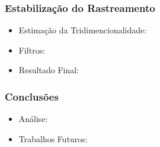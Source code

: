 \documentclass[brazil]{beamer}
\begin{document}
\begin{frame}
\frametitle{Estabilização do Rastreamento}
  \begin{itemize}
      \item Estimação da Tridimencionalidade:
      
      \item Filtros:         
  \end{itemize} 
\end{frame}

\begin{frame}
  \begin{itemize}
      \item Resultado Final:
              
  \end{itemize} 
\end{frame}


\begin{frame}
\frametitle{Conclusões}
  \begin{itemize}
      \item Análise:
      
      \item Trabalhos Futuros:
              
  \end{itemize} 
\end{frame}
\end{document}
